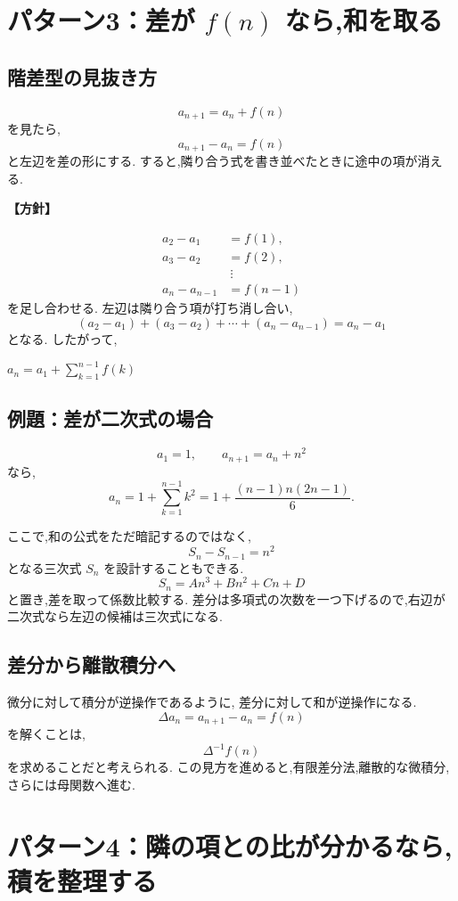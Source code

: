 \section{パターン3：差が $f(n)$ なら,和を取る}

\subsection{階差型の見抜き方}

\[
  a_{n+1}=a_n+f(n)
\]
を見たら,
\[
  a_{n+1}-a_n=f(n)
\]
と左辺を差の形にする.
すると,隣り合う式を書き並べたときに途中の項が消える.

\noindent\textbf{【方針】}

\[
\begin{aligned}
  a_2-a_1&=f(1),\\
  a_3-a_2&=f(2),\\
  &\ \vdots\\
  a_n-a_{n-1}&=f(n-1)
\end{aligned}
\]
を足し合わせる.
左辺は隣り合う項が打ち消し合い,
\[
  (a_2-a_1)+(a_3-a_2)+\cdots+(a_n-a_{n-1})
  =a_n-a_1
\]
となる.
したがって,
\begin{mdquote}
  $a_n=a_1+\sum_{k=1}^{n-1}f(k)$
\end{mdquote}

\subsection{例題：差が二次式の場合}

\[
  a_1=1,\qquad a_{n+1}=a_n+n^2
\]
なら,
\[
  a_n=1+\sum_{k=1}^{n-1}k^2
  =1+\frac{(n-1)n(2n-1)}6.
\]

ここで,和の公式をただ暗記するのではなく,
\[
  S_n-S_{n-1}=n^2
\]
となる三次式 $S_n$ を設計することもできる.
\[
  S_n=An^3+Bn^2+Cn+D
\]
と置き,差を取って係数比較する.
差分は多項式の次数を一つ下げるので,右辺が二次式なら左辺の候補は三次式になる.

\subsection{差分から離散積分へ}

微分に対して積分が逆操作であるように,
差分に対して和が逆操作になる.
\[
  \Delta a_n=a_{n+1}-a_n=f(n)
\]
を解くことは,
\[
  \Delta^{-1}f(n)
\]
を求めることだと考えられる.
この見方を進めると,有限差分法,離散的な微積分,
さらには母関数へ進む.

\section{パターン4：隣の項との比が分かるなら,積を整理する}

